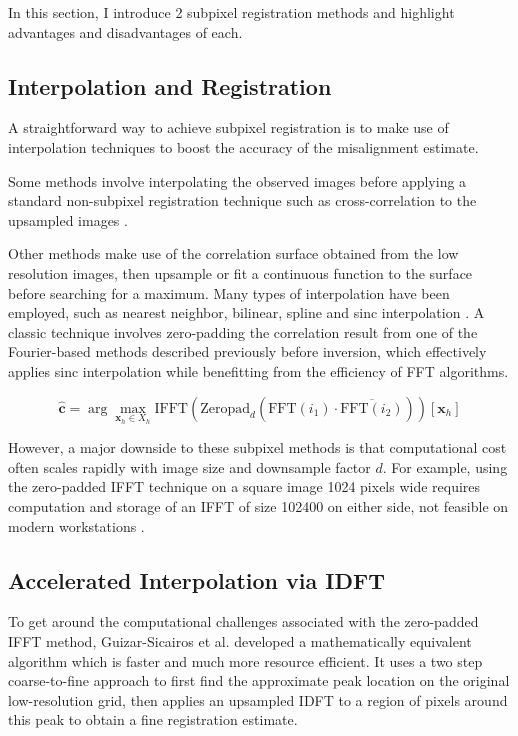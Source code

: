 \documentclass[tocnosub,noragright,centerchapter,12pt]{uiucecethesis09}
\begin{document}
In this section, I introduce 2 subpixel registration methods and highlight advantages and disadvantages of each.

\subsection{Interpolation and Registration}

A straightforward way to achieve subpixel registration is to make use of interpolation techniques to boost the accuracy of the misalignment estimate.

Some methods involve interpolating the observed images before applying a standard non-subpixel registration technique such as cross-correlation to the upsampled images \cite{interp}.

Other methods make use of the correlation surface obtained from the low resolution images, then upsample or fit a continuous function to the surface before searching for a maximum. Many types of interpolation have been employed, such as nearest neighbor, bilinear, spline and sinc interpolation \cite{interp2}.  A classic technique involves zero-padding the correlation result from one of the Fourier-based methods described previously before inversion, which effectively applies sinc interpolation while benefitting from the efficiency of FFT algorithms.

$$\hat{\bm{c}} = \arg \max_{\bm{x}_h \in X_h} \text{IFFT}\left( \text{Zeropad}_d \left( \text{FFT}(i_1) \cdot \overline{\text{FFT}(i_2)}\right)\right)[\bm{x}_h]$$

However, a major downside to these subpixel methods is that computational cost often scales rapidly with image size and downsample factor $d$.  For example, using the zero-padded IFFT technique on a square image 1024 pixels wide requires computation and storage of an IFFT of size 102400 on either side, not feasible on modern workstations \cite{guizar}.

\subsection{Accelerated Interpolation via IDFT}

To get around the computational challenges associated with the zero-padded IFFT method, Guizar-Sicairos et al. \cite{guizar} developed a mathematically equivalent algorithm which is faster and much more resource efficient.  It uses a two step coarse-to-fine approach to first find the approximate peak location on the original low-resolution grid, then applies an upsampled IDFT to a region of pixels around this peak to obtain a fine registration estimate.
\end{document}
